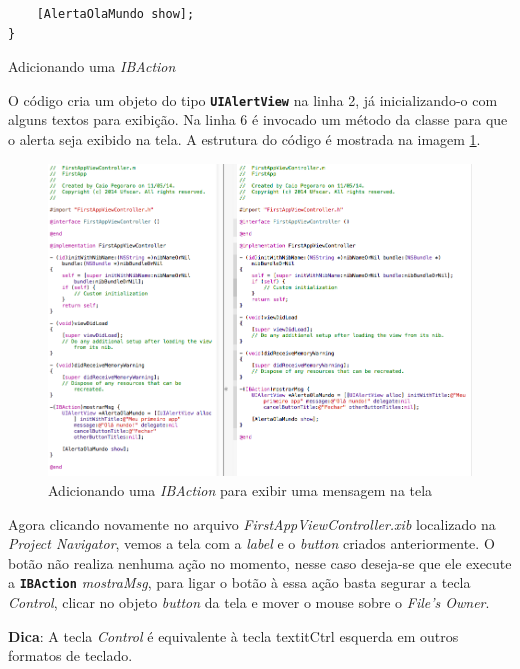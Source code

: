 \documentclass[a4paper,12pt,brazil,doubleside]{book}
\begin{document}
\begin{singlespace}
\begin{listing}
\begin{verbatim}
	[AlertaOlaMundo show];
}
\end{verbatim}
\caption{Adicionando uma \emph{IBAction}}
\end{listing}


O código cria um objeto do tipo \texttt{\textbf{UIAlertView}} na linha 2, já inicializando-o com alguns textos para exibição. Na linha 6 é invocado um método da classe para que o alerta seja exibido na tela. A estrutura do código é mostrada na imagem \ref{fig:IBAction_msg2}.

\begin{figure}[H]
  \centering
  \includegraphics[width=.99\textwidth]{figuras/3/tela_novo_projeto_22.png}
  \caption{Adicionando uma \emph{IBAction} para exibir uma mensagem na tela}
  \label{fig:IBAction_msg2}
\end{figure}


Agora clicando novamente no arquivo \emph{FirstAppViewController.xib} localizado na \emph{Project Navigator}, vemos a tela com a \emph{label} e o \emph{button} criados anteriormente. O botão não realiza nenhuma ação no momento, nesse caso deseja-se que ele execute a \texttt{\textbf{IBAction}} \emph{mostraMsg}, para ligar o botão à essa ação basta segurar a tecla \emph{Control}, clicar no objeto \emph{button} da tela e mover o mouse sobre o \emph{File's Owner}.

\begin{framed}

\textbf{Dica}: A tecla \textit{Control} é equivalente à tecla textit{Ctrl} esquerda em outros formatos de teclado.
\end{framed}


\end{singlespace}
\end{document}
